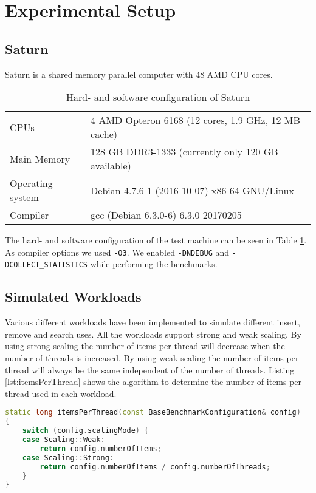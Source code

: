 \section{Experimental Setup}

\subsection{Saturn} \label{subsec:saturn}
Saturn is a shared memory parallel computer with 48 AMD CPU cores.

\begin{table}[H]
  \caption{Hard- and software configuration of Saturn}
  \label{tab:saturn} 
  \begin{center}
    \begin{tabular}{ll}
      \hline
      CPUs & 4 AMD Opteron 6168 (12 cores, 1.9 GHz, 12 MB cache)\\
      Main Memory & 128 GB DDR3-1333 (currently only 120 GB available)\\
      Operating system & Debian 4.7.6-1 (2016-10-07) x86-64 GNU/Linux\\
      Compiler & gcc (Debian 6.3.0-6) 6.3.0 20170205\\\hline
    \end{tabular}
  \end{center}
\end{table}

\noindent The hard- and software configuration of the test machine can be seen in Table \ref{tab:saturn}. As compiler options we used \verb|-O3|. We enabled \verb|-DNDEBUG| and \verb|-DCOLLECT_STATISTICS| while performing the benchmarks.

\subsection{Simulated Workloads}

Various different workloads have been implemented to simulate different insert, remove and search uses. All the workloads support strong and weak scaling. By using strong scaling the number of items per thread will decrease when the number of threads is increased. By using weak scaling the number of items per thread will always be the same independent of the number of threads. Listing \ref{lst:itemsPerThread} shows the algorithm to determine the number of items per thread used in each workload.

\begin{lstlisting}[language=C++, caption={Items Per Thread depending on the Scaling Mode}, label=lst:itemsPerThread]
static long itemsPerThread(const BaseBenchmarkConfiguration& config)
{
    switch (config.scalingMode) {
    case Scaling::Weak:
        return config.numberOfItems;
    case Scaling::Strong:
        return config.numberOfItems / config.numberOfThreads;
    }
}
\end{lstlisting}

